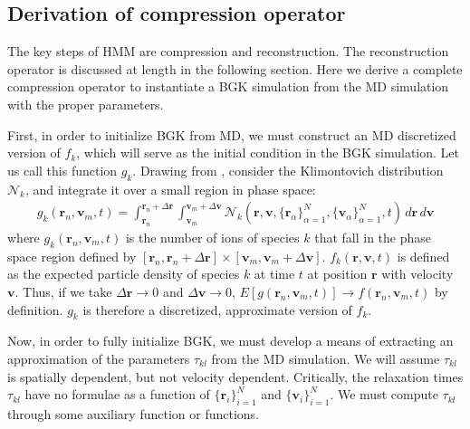 \documentclass{article}
\begin{document}
\subsection{Derivation of compression operator}

The key steps of HMM are compression and reconstruction. The reconstruction operator is discussed at length in the following section. Here we derive a complete compression operator to instantiate a BGK simulation from the MD simulation with the proper parameters.

First, in order to initialize BGK from MD, we must construct an MD discretized version of $f_k$, which will serve as the initial condition in the BGK simulation. Let us call this function $g_{k}$. Drawing from \cite{romero1997comments}, consider the Klimontovich distribution $\mathcal{N}_k$, and integrate it over a small region in phase space:
\begin{align*}
g_k(\mathbf{r}_n,\mathbf{v}_m,t)= \int_{\mathbf{r}_n}^{\mathbf{r}_n+\Delta \mathbf{r}} \int_{\mathbf{v}_m}^{\mathbf{v}_m+\Delta \mathbf{v}}\mathcal{N}_k(\mathbf{r},\mathbf{v},\{\mathbf{r}_\alpha\}_{\alpha=1}^N,\{\mathbf{v}_\alpha\}_{\alpha=1}^N,t)\,d\mathbf{r}\,d\mathbf{v}
\end{align*}
where $g_k(\mathbf{r}_n,\mathbf{v}_m,t)$ is the number of ions of species $k$ that fall in the phase space region defined by $[\mathbf{r}_n,\mathbf{r}_n+\Delta \mathbf{r}]\times [\mathbf{v}_m,\mathbf{v}_m+\Delta \mathbf{v}]$. $f_k(\mathbf{r},\mathbf{v},t)$ is defined as the expected particle density of species $k$ at time $t$ at position $\mathbf{r}$ with velocity $\mathbf{v}$. Thus, if we take $\Delta \mathbf{r}\to 0$ and $\Delta \mathbf{v}\to0$, $E[g(\mathbf{r}_n,\mathbf{v}_m,t)]\to f(\mathbf{r}_n,\mathbf{v}_m,t)$ by definition. $g_k$ is therefore a discretized, approximate version of $f_k$.

Now, in order to fully initialize BGK, we must develop a means of extracting an approximation of the parameters $\tau_{kl}$ from the MD simulation. We will assume $\tau_{kl}$ is spatially dependent, but not velocity dependent. Critically, the relaxation times $\tau_{kl}$ have no formulae as a function of $\{\mathbf{r}_i\}_{i=1}^N$ and $\{\mathbf{v}_i\}_{i=1}^N$. We must compute $\tau_{kl}$ through some auxiliary function or functions.
\end{document}
